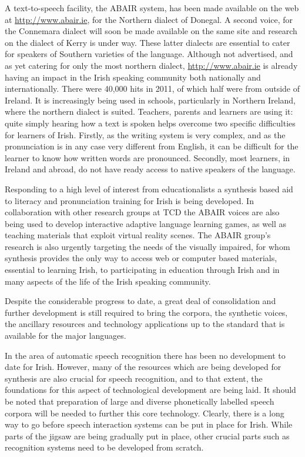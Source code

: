 \begin{multicols}{2}
A text-to-speech facility, the ABAIR system, has been made available on the web at \url{http://www.abair.ie}, for the Northern dialect of Donegal. A second voice, for the Connemara dialect will soon be made available on the same site and research on the dialect of Kerry is under way. These latter dialects are essential to cater for speakers of Southern varieties of the language.  
Although not advertised, and as yet catering for only the most northern dialect, \url{http://www.abair.ie} is already having an impact in the Irish speaking community both nationally and internationally. There were 40,000 hits in 2011, of which half were from outside of Ireland. It is increasingly being used in schools, particularly in Northern Ireland, where the northern dialect is suited. Teachers, parents and learners are using it: quite simply hearing how a text is spoken helps overcome two specific difficulties for learners of Irish. Firstly, as the writing system is very complex, and as the pronunciation is in any case very different from English, it can be difficult for the learner to know how written words are pronounced. Secondly, most learners, in Ireland and abroad, do not have ready access to native speakers of the language. 

Responding to a high level of interest from educationalists a synthesis based aid to literacy and pronunciation training for Irish is being developed. In collaboration with other research groups at TCD \cite{slate2011} the ABAIR voices are also being used to develop interactive adaptive language learning games, as well as teaching materials that exploit virtual reality scenes. The ABAIR group’s research is also urgently targeting the needs of the visually impaired, for whom synthesis provides the only way to access web or computer based materials, essential to learning Irish, to participating in education through Irish and in many aspects of the life of the Irish speaking community.

Despite the considerable progress to date, a great deal of consolidation and further development is still required to bring the corpora, the synthetic voices, the ancillary resources and technology applications up to the standard that is available for the major languages.

In the area of automatic speech recognition there has been no development to date for Irish. However, many of the resources which are being developed for synthesis are also crucial for speech recognition, and to that extent, the foundations for this aspect of technological development are being laid. It should be noted that preparation of large and diverse phonetically labelled speech corpora will be needed to further this core technology. Clearly, there is a long way to go before speech interaction systems can be put in place for Irish. While parts of the jigsaw are being gradually put in place, other crucial parts such as recognition systems need to be developed from scratch.


\end{multicols}
